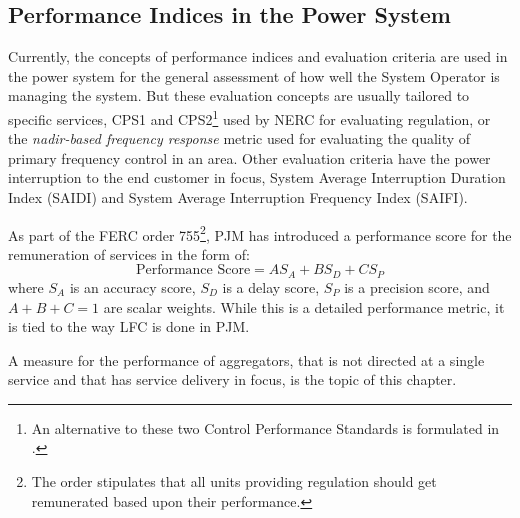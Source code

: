 \subsection{Performance Indices in the Power System}
Currently, the concepts of performance indices and evaluation criteria are used in the power system for the general assessment of how well the System Operator is managing the system. But these evaluation concepts are usually tailored to specific services, \eg CPS1 and CPS2\footnote{An alternative to these two Control Performance Standards is formulated in \cite{gross2001analysis}.} used by NERC for evaluating regulation, or the \emph{nadir-based frequency response} metric used for evaluating the quality of primary frequency control in an area. Other evaluation criteria have the power interruption to the end customer in focus, \eg System Average Interruption Duration Index (SAIDI) and System Average Interruption Frequency Index (SAIFI). 

As part of the FERC order 755\footnote{The order stipulates that all units providing regulation should get remunerated based upon their performance.}, PJM has introduced a performance score for the remuneration of services in the form of:
\begin{equation}
	\text{Performance Score} = A S_A + B S_D +C S_P
\end{equation}
where $S_A$ is an accuracy score, $S_D$ is a delay score, $S_P$ is a precision score, and $A+B+C =1$ are scalar weights. While this is a detailed performance metric, it is tied to the way LFC is done in PJM. 

A measure for the performance of aggregators, that is not directed at a single service and that has service delivery in focus, is the topic of this chapter.

